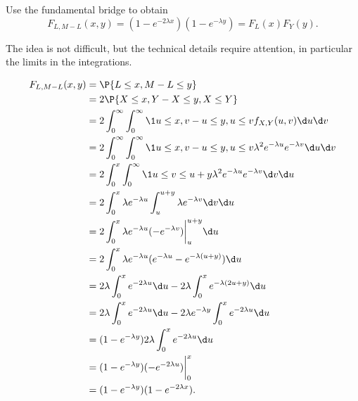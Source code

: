 \documentclass[a4paper]{article}
\begin{document}
\begin{exercise}
Use the fundamental bridge to obtain
\begin{equation*}
F_{L,M-L}(x,y) = (1- e^{-2\lambda x}) (1-e^{-\lambda y}) =  F_L(x) F_Y(y).
\end{equation*}
\begin{hint}
The idea is not difficult, but the technical details require attention, in particular the limits in the integrations.
\end{hint}
\begin{solution}
\begin{align*}
F_{L, M-L}(x, y)
&=\P{L\leq x, M-L\leq y}\\
&= 2\P{X\leq x, Y-X \leq y, X \leq Y} \\
&= 2\int_0^{\infty} \int_0^{\infty} \1{u\leq x, v-u\leq y, u \leq v} f_{X,Y}(u, v)  \d u \d v\\
&= 2\int_0^{\infty} \int_0^{\infty} \1{u\leq x, v-u\leq y, u\leq v} \lambda^2e^{-\lambda u}e^{-\lambda v}\d u \d v\\
&= 2\int_0^{x} \int_0^{\infty} \1{u\leq v\leq u+y} \lambda^2e^{-\lambda u}e^{-\lambda v}\d v \d u\\
&= 2\int_0^{x} \lambda e^{-\lambda u} \int_u   ^{u + y}  \lambda e^{-\lambda v}\d v \d u\\
&= 2\int_0^{x} \lambda e^{-\lambda u} (-e^{-\lambda v}) \biggr|_u^{u+y}\d u \\
&= 2\int_0^{x} \lambda e^{-\lambda u} (e^{-\lambda u} - e^{-\lambda (u+y)})\d u \\
&= 2\lambda\int_0^{x}  e^{-2 \lambda u}\d u  - 2\lambda \int_{0}^{x} e^{-\lambda (2u+y)}\d u \\
&= 2\lambda\int_0^{x}  e^{-2 \lambda u}\d u  - 2\lambda e^{-\lambda y }\int_{0}^{x} e^{-2 \lambda u}\d u \\
&= (1-e^{-\lambda y}) 2 \lambda \int_0^{x} e^{-2 \lambda u} \d u\\
&= (1-e^{-\lambda y}) ( -e^{-2\lambda u}) \biggr|_0^{x} \\
&= (1-e^{-\lambda y})(1- e^{-2\lambda x}).
\end{align*}
\end{solution}
\label{ex:27}
\end{exercise}
\end{document}
